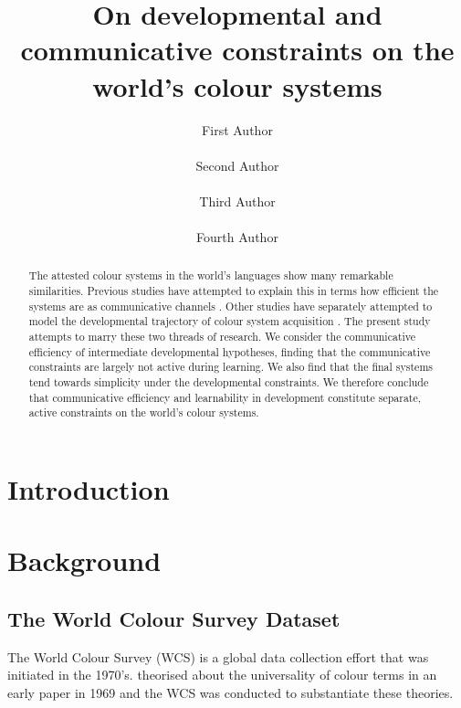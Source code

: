 \documentclass[11pt]{article}
\title{On developmental and communicative constraints on the world's colour systems}
\author{First Author \\
 \\\And
 Second Author \\
 \\\AND
 Third Author \\
 \\\And
 Fourth Author \\
 }
\date{}
\begin{document}
\maketitle
\pagestyle{plain} %
\thispagestyle{plain} %
\linenumbers %
\begin{abstract}
The attested colour systems in the world's languages show many remarkable similarities. 
Previous studies have attempted to explain this in terms how efficient the systems are as communicative channels \cite{zaslavsky2018efficient}. 
Other studies have separately attempted to model the developmental trajectory of colour system acquisition \cite{beekhuizen2016modeling}. 
The present study attempts to marry these two threads of research. 
We consider the communicative efficiency of intermediate developmental hypotheses, finding that the communicative constraints are largely not active during learning. 
We also find that the final systems tend towards simplicity under the developmental constraints. 
We therefore conclude that communicative efficiency and learnability in development constitute separate, active constraints on the world's colour systems.
\end{abstract}

\section{Introduction}
\label{sec:intro}

\section{Background}
\label{sec:background}



\subsection{The World Colour Survey Dataset}
\label{ssec:color_dataset}

The World Colour Survey (WCS) \cite{berlin1991basic} is a global data collection effort that was initiated in the 1970's.
\citet{berlin1991basic} theorised about the universality of colour terms in an early paper in 1969 and the WCS was conducted to substantiate these theories.
\end{document}
